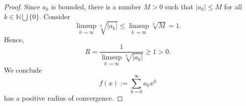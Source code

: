 \begin{Exercise}
\begin{proof}
Since $a_k$ is bounded, there is a number $M > 0$ such that $|a_k| \leq M$ for all $k\in\mathbb{N}\bigcup\{0\}$.
Consider $$\limsup_{k\to\infty}\sqrt[k]{|a_k|} 
\leq \limsup_{k\to\infty}\sqrt[k]{M}
= 1.$$ Hence,
$$ R = \frac{1}{\limsup_{k\to\infty}\sqrt[k]{|a_k|}}
\geq 1 
> 0.$$
We conclude $$f(x) := \sum_{k=0}^{\infty}a_k x^k$$ has a positive radius of convergence.
\end{proof}
\end{Exercise}